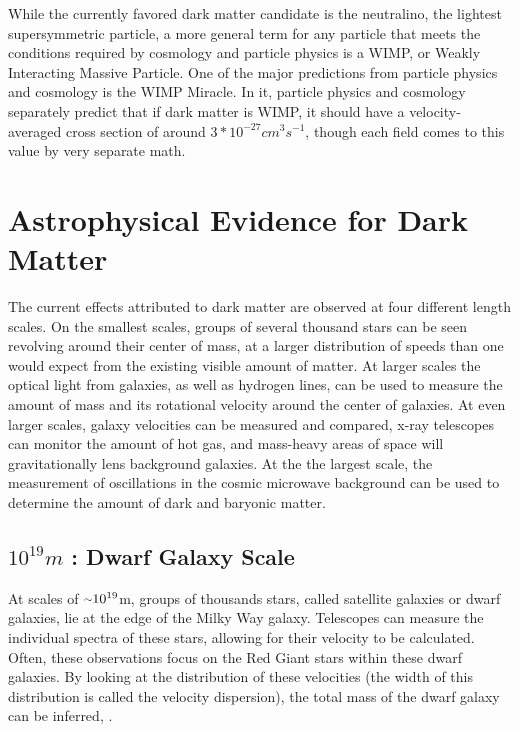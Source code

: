   While the currently favored dark matter candidate is the neutralino, the lightest supersymmetric particle, a more general term for any particle that meets the conditions required by cosmology and particle physics is a WIMP, or Weakly Interacting Massive Particle.
  One of the major predictions from particle physics and cosmology is the WIMP Miracle.
  In it, particle physics and cosmology separately predict that if dark matter is WIMP, it should have a velocity-averaged cross section of around $3*10^{-27}cm^{3}s^{-1}$, though each field comes to this value by very separate math.

\section{Astrophysical Evidence for Dark Matter}
  The current effects attributed to dark matter are observed at four different length scales.
  On the smallest scales, groups of several thousand stars can be seen revolving around their center of mass, at a larger distribution of speeds than one would expect from the existing visible amount of matter.
  At larger scales the optical light from galaxies, as well as hydrogen lines, can be used to measure the amount of mass and its rotational velocity around the center of galaxies.
  At even larger scales, galaxy velocities can be measured and compared, x-ray telescopes can monitor the amount of hot gas, and mass-heavy areas of space will gravitationally lens background galaxies.
  At the the largest scale, the measurement of oscillations in the cosmic microwave background can be used to determine the amount of dark and baryonic matter.
  
  \subsection{$10^{19}m$ : Dwarf Galaxy Scale}
    At scales of $\nicetilde 10^{19}$m, groups of thousands stars, called satellite galaxies or dwarf galaxies, lie at the edge of the Milky Way galaxy.
    Telescopes can measure the individual spectra of these stars, allowing for their velocity to be calculated.
    Often, these observations focus on the Red Giant stars within these dwarf galaxies\cite{dwarf_gal_red_giant}.
    By looking at the distribution of these velocities (the width of this distribution is called the velocity dispersion), the total mass of the dwarf galaxy can be inferred\cite{dwarf_gal_vel_dispersion}, \cite{dwarf_gal_vel_dispersion2}.

